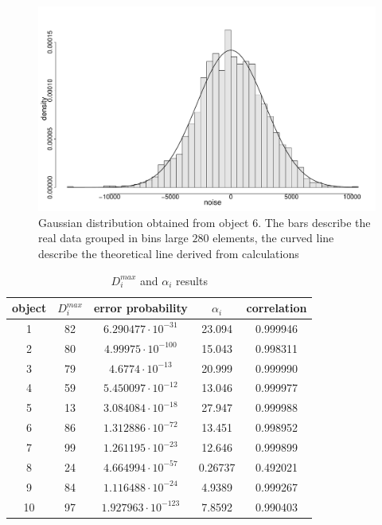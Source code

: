 \documentclass[conference]{IEEEtran}
\begin{document}
\begin{figure}[t]
    \centering
    \includegraphics[width=\columnwidth]{graphs/GaussianDistribution}
    \caption{Gaussian distribution obtained from object \num{6}. The bars describe the real data grouped in bins large \(280\) elements, the curved line describe the theoretical line derived from calculations}
    \label{grph:gaussian}
\end{figure}

\begin{table}
    \centering
    \caption{\(D_i^{max}\) and \(\alpha_i\) results}
    \label{tab:resultsobjects}
    \begin{tabular}{c|cc|cc}
        \toprule
        object & \(D_i^{max}\) & error probability & \(\alpha_i\) & correlation \\
        \midrule
        \num{1} & \num{82} & \(6.290477\cdot10^{-31}\) & \num{23.094} & \num{0.999946} \\
        \num{2} & \num{80} & \(4.99975\cdot10^{-100}\) & \num{15.043} & \num{0.998311} \\
        \num{3} & \num{79} & \(4.6774\cdot10^{-13}\) & \num{20.999} & \num{0.999990} \\
        \num{4} & \num{59} & \(5.450097\cdot10^{-12}\) & \num{13.046} & \num{0.999977} \\
        \num{5} & \num{13} & \(3.084084\cdot10^{-18}\) & \num{27.947} & \num{0.999988} \\
        \num{6} & \num{86} & \(1.312886\cdot10^{-72}\) & \num{13.451} & \num{0.998952} \\
        \num{7} & \num{99} & \(1.261195\cdot10^{-23}\) & \num{12.646} & \num{0.999899} \\
        \num{8} & \num{24} & \(4.664994\cdot10^{-57}\) & \num{0.26737} & \num{0.492021} \\
        \num{9} & \num{84} & \(1.116488\cdot10^{-24}\) & \num{4.9389} & \num{0.999267} \\
        \num{10} & \num{97} & \(1.927963\cdot10^{-123}\)  & \num{7.8592} & \num{0.990403} \\
        \bottomrule
    \end{tabular}
\end{table}
\end{document}
